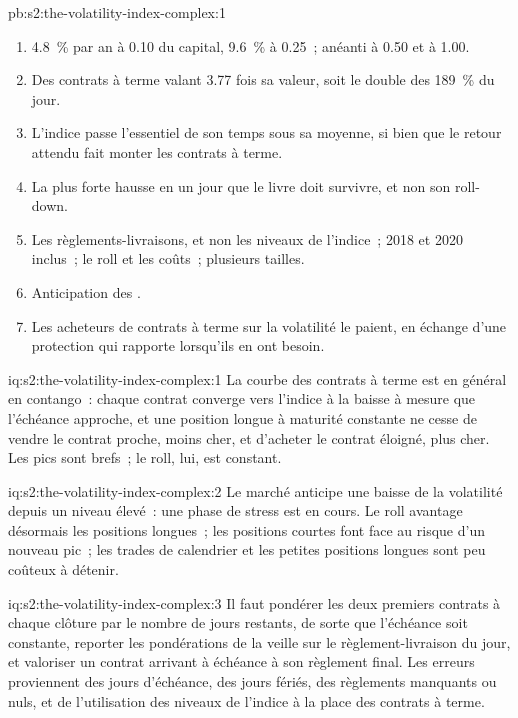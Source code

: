 \begin{solution}{pb:s2:the-volatility-index-complex:1}
\begin{enumerate}
\item 4.8~\% par an à 0.10 du capital, 9.6~\% à 0.25~; anéanti à 0.50 et à 1.00.
\item Des contrats à terme valant 3.77 fois sa valeur, soit le double des 189~\% du jour.
\item L'indice passe l'essentiel de son temps sous sa moyenne, si bien que le retour attendu fait monter les contrats à terme.
\item La plus forte hausse en un jour que le livre doit survivre, et non son roll-down.
\item Les règlements-livraisons, et non les niveaux de l'indice~; 2018 et 2020 inclus~; le roll et les coûts~; plusieurs tailles.
\item Anticipation des .
\item Les acheteurs de contrats à terme sur la volatilité le paient, en échange d'une protection qui rapporte lorsqu'ils en ont besoin.
\end{enumerate}
\end{solution}

\begin{solution}{iq:s2:the-volatility-index-complex:1}
La courbe des contrats à terme est en général en contango~: chaque contrat converge vers l'indice à la baisse à mesure que l'échéance approche, et une position longue à maturité constante ne cesse de
vendre le contrat proche, moins cher, et d'acheter le contrat éloigné, plus cher. Les pics sont brefs~; le roll, lui, est constant.
\end{solution}

\begin{solution}{iq:s2:the-volatility-index-complex:2}
Le marché anticipe une baisse de la volatilité depuis un niveau élevé~: une phase de stress est en cours. Le roll avantage désormais les positions longues~; les positions courtes font face au risque d'un nouveau
pic~; les trades de calendrier et les petites positions longues sont peu coûteux à détenir.
\end{solution}

\begin{solution}{iq:s2:the-volatility-index-complex:3}
Il faut pondérer les deux premiers contrats à chaque clôture par le nombre de jours restants, de sorte que l'échéance soit constante, reporter les pondérations de la veille sur le règlement-livraison du jour, et
valoriser un contrat arrivant à échéance à son règlement final. Les erreurs proviennent des jours d'échéance, des jours fériés, des règlements manquants ou nuls, et de l'utilisation des niveaux de l'indice à la place des
contrats à terme.
\end{solution}

